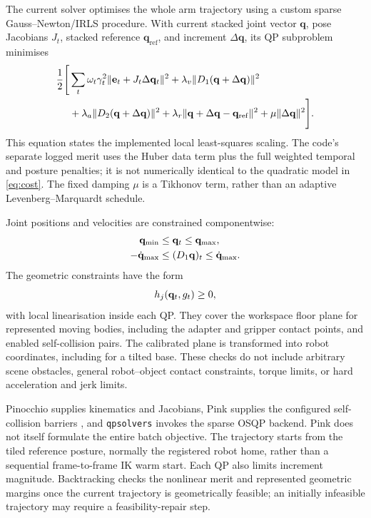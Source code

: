 The current solver optimises the whole arm trajectory using a custom
sparse Gauss--Newton/IRLS procedure. With current stacked joint vector
$\mathbf q$, pose Jacobians $J_t$, stacked reference
$\mathbf q_{\mathrm{ref}}$, and increment $\Delta\mathbf q$, its QP
subproblem minimises
\begin{equation}
\begin{split}
  \frac12\Bigg[&\sum_t\omega_t\gamma_t^2
       \lVert\mathbf{e}_t+J_t\Delta\mathbf{q}_t\rVert^{2}
       +\lambda_v\lVert D_1(\mathbf q+\Delta\mathbf q)\rVert^2\\
       &+\lambda_a\lVert D_2(\mathbf q+\Delta\mathbf q)\rVert^2
       +\lambda_r\lVert\mathbf q+\Delta\mathbf q-\mathbf q_{\mathrm{ref}}\rVert^2
       +\mu\lVert\Delta\mathbf q\rVert^2\Bigg].
\end{split}
\label{eq:cost}
\end{equation}
This equation states the implemented local least-squares scaling.
The code's separate logged merit uses the Huber data term plus the full
weighted temporal and posture penalties; it is not numerically identical
to the quadratic model in \eqref{eq:cost}. The fixed damping $\mu$ is a
Tikhonov term, rather than an adaptive Levenberg--Marquardt schedule.

Joint positions and velocities are constrained componentwise:
\begin{align}
  \mathbf{q}_{\min}&\leq\mathbf{q}_t\leq\mathbf{q}_{\max},
       \label{eq:cjoint}\\
  -\dot{\mathbf{q}}_{\max}&\leq(D_1\mathbf{q})_t\leq\dot{\mathbf{q}}_{\max}.
       \label{eq:cvel}
\end{align}
The geometric constraints have the form
\begin{equation}
  h_j(\mathbf{q}_t,g_t)\geq0,
  \label{eq:ccoll}
\end{equation}
with local linearisation inside each QP. They cover the workspace floor
plane for represented moving bodies, including the adapter and gripper
contact points, and enabled self-collision pairs. The calibrated plane is
transformed into robot coordinates, including for a tilted base.
These checks do not include arbitrary scene obstacles, general
robot--object contact constraints, torque limits, or hard acceleration
and jerk limits.

Pinocchio supplies kinematics and Jacobians, Pink supplies the configured
self-collision barriers \cite{pink}, and \texttt{qpsolvers} invokes the
sparse OSQP backend. Pink does not itself formulate the entire batch
objective. The trajectory starts from the tiled reference posture, normally
the registered robot home, rather than a sequential frame-to-frame IK
warm start. Each QP also limits increment magnitude. Backtracking checks
the nonlinear merit and represented geometric margins once the current
trajectory is geometrically feasible; an initially infeasible trajectory
may require a feasibility-repair step.

